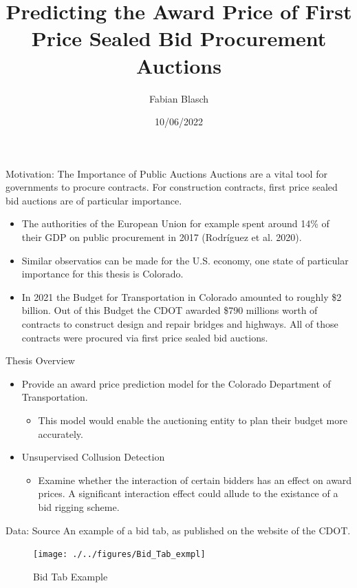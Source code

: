 \documentclass[
  11pt,
  ignorenonframetext,
]{beamer}
\title{Predicting the Award Price of First Price Sealed Bid Procurement
Auctions}
\author{Fabian Blasch}
\date{10/06/2022}
\providecommand{\tightlist}{%
  \setlength{\itemsep}{0pt}\setlength{\parskip}{0pt}}
\begin{document}
\frame{\titlepage}

\begin{frame}{Motivation: The Importance of Public Auctions}
\protect\hypertarget{motivation-the-importance-of-public-auctions}{}
Auctions are a vital tool for governments to procure contracts. For
construction contracts, first price sealed bid auctions are of
particular importance.

\begin{itemize}
\item
  The authorities of the European Union for example spent around 14\% of
  their GDP on public procurement in 2017 (Rodríguez et al. 2020).
\item
  Similar observatios can be made for the U.S. economy, one state of
  particular importance for this thesis is Colorado.
\item
  In 2021 the Budget for Transportation in Colorado amounted to roughly
  \$2 billion. Out of this Budget the CDOT awarded \$790 millions worth
  of contracts to construct design and repair bridges and highways. All
  of those contracts were procured via first price sealed bid auctions.
\end{itemize}
\end{frame}

\begin{frame}{Thesis Overview}
\protect\hypertarget{thesis-overview}{}
\begin{itemize}
\item
  Provide an award price prediction model for the Colorado Department of
  Transportation.

  \begin{itemize}
  \tightlist
  \item
    This model would enable the auctioning entity to plan their budget
    more accurately.
  \end{itemize}
\item
  Unsupervised Collusion Detection

  \begin{itemize}
  \tightlist
  \item
    Examine whether the interaction of certain bidders has an effect on
    award prices. A significant interaction effect could allude to the
    existance of a bid rigging scheme.
  \end{itemize}
\end{itemize}
\end{frame}

\begin{frame}{Data: Source}
\protect\hypertarget{data-source}{}
An example of a bid tab, as published on the website of the CDOT.

\begin{figure}

{\centering \texttt{[image: ./../figures/Bid\_Tab\_exmpl]} 

}

\caption{Bid Tab Example}\label{fig:unnamed-chunk-2}
\end{figure}
\end{frame}
\end{document}
